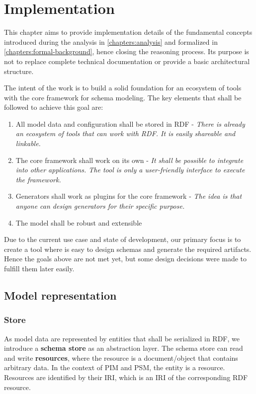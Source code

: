 \chapter{Implementation}\label{chapters:implementation}

This chapter aims to provide implementation details of the fundamental concepts introduced during the analysis in \autoref{chapters:analysis} and formalized in \autoref{chapters:formal-background}, hence closing the reasoning process. Its purpose is not to replace complete technical documentation or provide a basic architectural structure.

\bigskip

The intent of the work is to build a solid foundation for an ecosystem of tools with the core framework for schema modeling. The key elements that shall be followed to achieve this goal are:
\begin{enumerate}
    \item All model data and configuration shall be stored in RDF - \textit{There is already an ecosystem of tools that can work with RDF. It is easily shareable and linkable.}
    \item The core framework shall work on its own - \textit{It shall be possible to integrate into other applications. The tool is only a user-friendly interface to execute the framework.}
    \item Generators shall work as plugins for the core framework - \textit{The idea is that anyone can design generators for their specific purpose.}
    \item The model shall be robust and extensible
\end{enumerate}

Due to the current use case and state of development, our primary focus is to create a tool where is easy to design schemas and generate the required artifacts. Hence the goals above are not met yet, but some design decisions were made to fulfill them later easily.

\section{Model representation}

\subsection{Store}

As model data are represented by entities that shall be serialized in RDF, we introduce a \textbf{schema store} as an abstraction layer. The schema store can read and write \textbf{resources}, where the resource is a document/object that contains arbitrary data. In the context of PIM and PSM, the entity is a resource. Resources are identified by their IRI, which is an IRI of the corresponding RDF resource.

